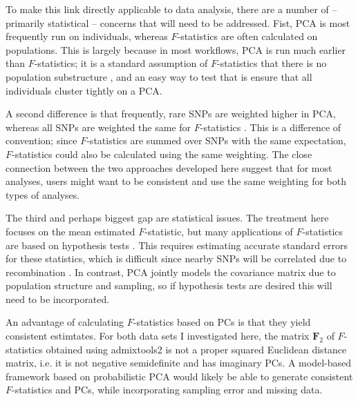 \documentclass[12pt,fullpage, a4paper]{article}
\newcommand{\MF}{\mathbf{F}_2} %
\begin{document}
To make this link directly applicable to data analysis, there are a number of -- primarily statistical -- concerns that will need to be addressed. Fist, PCA is most frequently run on individuals, whereas $F$-statistics are often calculated on populations. This is largely because in most workflows, PCA is run much earlier than $F$-statistics; it is a standard assumption of $F$-statistics that there is no population substructure \citep{patterson2012}, and an easy way to test that is ensure that all individuals cluster tightly on a PCA. 

A second difference is that frequently, rare SNPs are weighted higher in PCA, whereas all SNPs are weighted the same for $F$-statistics \citep{patterson2006, patterson2012}. This is a difference of convention; since $F$-statistics are summed over SNPs with the same expectation, $F$-statistics could also be calculated using the same weighting. The close connection between the two approaches developed here suggest that for most analyses, users might want to be consistent and use the same weighting for both types of analyses. 

The third and perhaps biggest gap are statistical issues. The treatment here focuses on the mean estimated $F$-statistic, but many  applications of $F$-statistics are based on hypothesis tests \citep{patterson2012}. This requires estimating accurate standard errors for these statistics, which is difficult since nearby SNPs will be correlated due to recombination \citep{hahn2018}. In contrast, PCA jointly models the covariance matrix due to population structure and sampling, so if hypothesis tests are desired this will need to be incorporated.

An advantage of calculating $F$-statistics based on PCs is that they yield consistent estimtates. For both data sets I investigated here, the matrix $\MF$ of $F$-statistics obtained  using admixtools2 is not a proper squared Euclidean distance matrix, i.e. it is not negative semidefinite and has imaginary PCs. A model-based framework based on probabilistic PCA \citep{hastie2015, meisner2021, agrawal2020} would likely be able to generate consistent $F$-statistics and PCs, while incorporating sampling error and missing data.


\appendix
\end{document}

